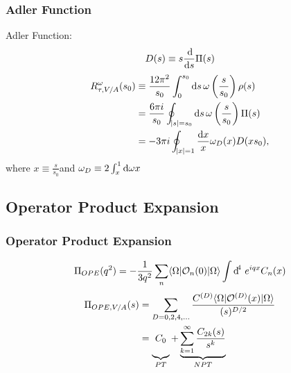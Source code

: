 \documentclass[fleqn]{beamer}
\begin{document}
\begin{frame}
  \frametitle{Adler Function}
  Adler Function:
  \begin{equation}
    D(s) \equiv s \frac{\dif}{\dif s} \Pi(s)
  \end{equation}
  \begin{equation}
    \begin{split}
      R_{\tau, V/A}^{\omega}(s_0) &\equiv \frac{12 \pi^2}{s_0} \int_{0}^{s_0} \dif s \, \omega\left( \frac{s}{s_0} \right) \rho(s) \\
      &= \frac{6 \pi i}{s_0} \oint_{\abs{s}=s_0} \dif s \, \omega\left(\frac{s}{s_0} \right) \Pi(s) \\
      &= -3 \pi i \oint_{\abs{x}=1} \frac{\dif x}{x} \omega_D(x) D(x s_0),
    \end{split}
  \end{equation}
  where \(x \equiv \frac{s}{s_0}\)and \(\omega_D \equiv 2 \int_x^1
  \dif \omega{x}\)
\end{frame}

\subsection{Operator Product Expansion}
\begin{frame}
  \frametitle{Operator Product Expansion}
  \begin{equation}
    \Pi_{OPE}(q^2) = -\frac{1}{3 q^2}\sum_n \langle\Omega\vert \mathcal{O}_n(0) \vert\Omega\rangle \int \dif^4\, e^{iqx} C_n(x)
  \end{equation}
  \begin{equation}
    \begin{split}
    \Pi_{OPE, V/A}(s) &= \sum_{D=0,2,4,\dots} \frac{C^{(D)} \langle\Omega\vert \mathcal{O}^{(D)}(x) \vert\Omega\rangle}{(s)^{D/2}} \\
    &= \underbrace{\vphantom{\sum_{k=1}^\infty} C_0}_{PT} + \underbrace{\sum_{k=1}^\infty \frac{C_{2k}(s)}{s^k}}_{NPT}
  \end{split}
\end{equation}
\end{frame}
\end{document}
